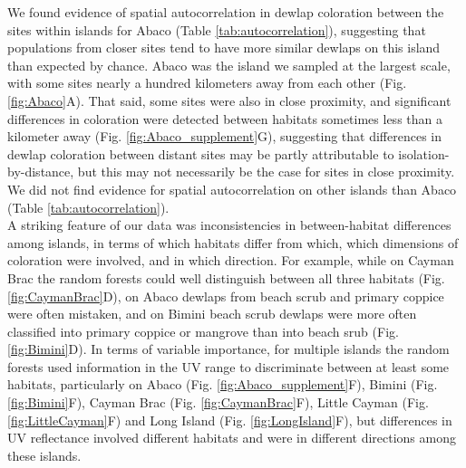 We found evidence of spatial autocorrelation in dewlap coloration between the sites within islands for Abaco (Table \ref{tab:autocorrelation}), suggesting that populations from closer sites tend to have more similar dewlaps on this island than expected by chance. Abaco was the island we sampled at the largest scale, with some sites nearly a hundred kilometers away from each other (Fig. \ref{fig:Abaco}A). That said, some sites were also in close proximity, and significant differences in coloration were detected between habitats sometimes less than a kilometer away (Fig. \ref{fig:Abaco_supplement}G), suggesting that differences in dewlap coloration between distant sites may be partly attributable to isolation-by-distance, but this may not necessarily be the case for sites in close proximity. We did not find evidence for spatial autocorrelation on other islands than Abaco (Table \ref{tab:autocorrelation}).\\

A striking feature of our data was inconsistencies in between-habitat differences among islands, in terms of which habitats differ from which, which dimensions of coloration were involved, and in which direction. For example, while on Cayman Brac the random forests could well distinguish between all three habitats (Fig. \ref{fig:CaymanBrac}D), on Abaco dewlaps from beach scrub and primary coppice were often mistaken, and on Bimini beach scrub dewlaps were more often classified into primary coppice or mangrove than into beach srub (Fig. \ref{fig:Bimini}D). In terms of variable importance, for multiple islands the random forests used information in the UV range to discriminate between at least some habitats, particularly on Abaco (Fig. \ref{fig:Abaco_supplement}F), Bimini (Fig. \ref{fig:Bimini}F), Cayman Brac (Fig. \ref{fig:CaymanBrac}F), Little Cayman (Fig. \ref{fig:LittleCayman}F) and Long Island (Fig. \ref{fig:LongIsland}F), but differences in UV reflectance involved different habitats and were in different directions among these islands.\\